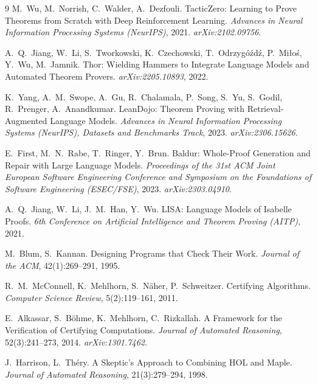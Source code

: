 \documentclass[11pt]{article}
\numberwithin{equation}{section}
\begin{document}
\begin{thebibliography}{9}
M.~Wu, M.~Norrish, C.~Walder, A.~Dezfouli.
\newblock TacticZero: Learning to Prove Theorems from Scratch with Deep Reinforcement Learning.
\newblock \emph{Advances in Neural Information Processing Systems (NeurIPS)}, 2021. \emph{arXiv:2102.09756}.

A.~Q.~Jiang, W.~Li, S.~Tworkowski, K.~Czechowski, T.~Odrzyg\'{o}\'{z}d\'{z}, P.~Mi\l{}o\'{s}, Y.~Wu, M.~Jamnik.
\newblock Thor: Wielding Hammers to Integrate Language Models and Automated Theorem Provers.
\newblock \emph{arXiv:2205.10893}, 2022.

K.~Yang, A.~M.~Swope, A.~Gu, R.~Chalamala, P.~Song, S.~Yu, S.~Godil, R.~Prenger, A.~Anandkumar.
\newblock LeanDojo: Theorem Proving with Retrieval-Augmented Language Models.
\newblock \emph{Advances in Neural Information Processing Systems (NeurIPS), Datasets and Benchmarks Track}, 2023. \emph{arXiv:2306.15626}.

E.~First, M.~N.~Rabe, T.~Ringer, Y.~Brun.
\newblock Baldur: Whole-Proof Generation and Repair with Large Language Models.
\newblock \emph{Proceedings of the 31st ACM Joint European Software Engineering Conference and Symposium on the Foundations of Software Engineering (ESEC/FSE)}, 2023. \emph{arXiv:2303.04910}.

A.~Q.~Jiang, W.~Li, J.~M.~Han, Y.~Wu.
\newblock LISA: Language Models of Isabelle Proofs.
\newblock \emph{6th Conference on Artificial Intelligence and Theorem Proving (AITP)}, 2021.

M.~Blum, S.~Kannan.
\newblock Designing Programs that Check Their Work.
\newblock \emph{Journal of the ACM}, 42(1):269--291, 1995.

R.~M.~McConnell, K.~Mehlhorn, S.~N\"{a}her, P.~Schweitzer.
\newblock Certifying Algorithms.
\newblock \emph{Computer Science Review}, 5(2):119--161, 2011.

E.~Alkassar, S.~B\"{o}hme, K.~Mehlhorn, C.~Rizkallah.
\newblock A Framework for the Verification of Certifying Computations.
\newblock \emph{Journal of Automated Reasoning}, 52(3):241--273, 2014. \emph{arXiv:1301.7462}.

J.~Harrison, L.~Th\'{e}ry.
\newblock A Skeptic's Approach to Combining HOL and Maple.
\newblock \emph{Journal of Automated Reasoning}, 21(3):279--294, 1998.


\end{thebibliography}
\end{document}
